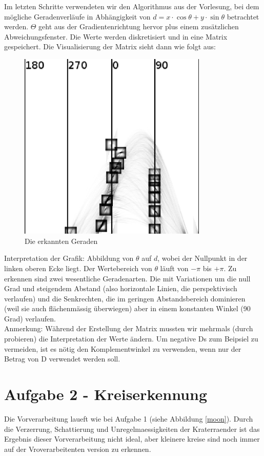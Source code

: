 Im letzten Schritte verwendeten wir den Algorithmus aus der Vorlesung, bei dem 
m\"ogliche Geradenverl\"aufe in Abh\"angigkeit von $d = x \cdot \cos \theta + y \cdot \sin \theta $
betrachtet werden. $\Theta$ geht aus der Gradientenrichtung hervor plus einem zus\"atzlichen
Abweichungsfenster. Die Werte werden diskretisiert und in eine Matrix gespeichert. Die Visualisierung
der Matrix sieht dann wie folgt aus:

\begin{figure} [H]
\begin{center}
\includegraphics[width=90mm]{u10/lines.eps}
\end{center}
\label{streetl}
\caption{Die erkannten Geraden}
\end{figure}

Interpretation der Grafik: Abbildung von $\theta$ auf $d$, wobei der Nullpunkt in der linken oberen
Ecke liegt. Der Wertebereich von $\theta$ l\"auft von $-\pi$ bis $+\pi$. Zu erkennen sind zwei 
wesentliche Geradenarten. Die mit Variationen um die null Grad und steigendem Abstand (also 
horizontale Linien, die perspektivisch verlaufen) und die Senkrechten, die im geringen Abstandsbereich
dominieren (weil sie auch fl\"achenm\"assig \"uberwiegen) aber in einem konstanten Winkel (90 Grad)
verlaufen.
\\
Anmerkung: W\"ahrend der Erstellung der Matrix mussten wir mehrmals (durch probieren) die
Interpretation der Werte \"andern. Um negative Ds zum Beipsiel zu vermeiden, ist es n\"otig
den Komplementwinkel zu verwenden, wenn nur der Betrag von D verwendet werden soll.

\section*{Aufgabe 2 - Kreiserkennung}
Die Vorverarbeitung laueft wie bei Aufgabe 1 (siehe Abbildung \ref{moon}). Durch
die Verzerrung, Schattierung und Unregelmaessigkeiten der Kraterraender ist das
Ergebnis dieser Vorverarbeitung nicht ideal, aber kleinere kreise sind noch
immer auf der Vroverarbeitenten version zu erkennen.

